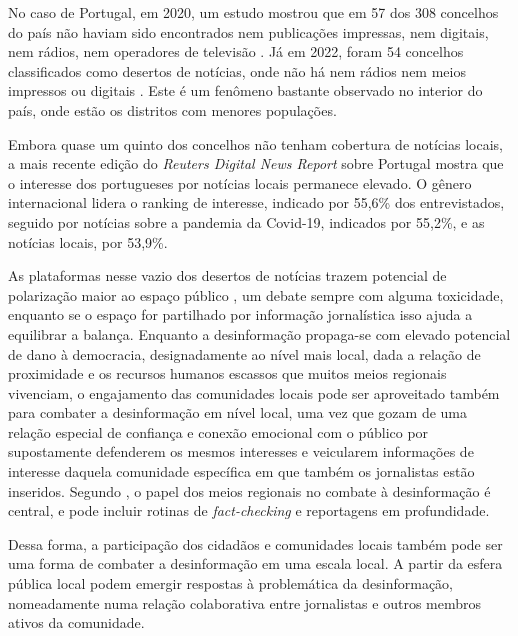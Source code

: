 \documentclass[portuguese]{textolivre}
\begin{document}
No caso de Portugal, em 2020, um estudo mostrou que em 57 dos 308 concelhos do país não haviam sido encontrados nem publicações impressas, nem digitais, nem rádios, nem operadores de televisão \cite{ramos2021deserto}. Já em 2022, foram 54 concelhos classificados como desertos de notícias, onde não há nem rádios nem meios impressos ou digitais \cite{jeronimo2022}. Este é um fenômeno bastante observado no interior do país, onde estão os distritos com menores populações.

Embora quase um quinto dos concelhos não tenham cobertura de notícias locais, a mais recente edição do \emph{Reuters Digital News Report} sobre Portugal \cite{cardoso__reuters_2022} mostra que o interesse dos portugueses por notícias locais permanece elevado. O gênero internacional lidera o ranking de interesse, indicado por 55,6\% dos entrevistados, seguido por notícias sobre a pandemia da Covid-19, indicados por 55,2\%, e as notícias locais, por 53,9\%.

As plataformas nesse vazio dos desertos de notícias trazem potencial de polarização maior ao espaço público \cite{abernathy2022}, um debate sempre com alguma toxicidade, enquanto se o espaço for partilhado por informação jornalística isso ajuda a equilibrar a balança. Enquanto a desinformação propaga-se com elevado potencial de dano à democracia, designadamente ao nível mais local, dada a relação de proximidade e os recursos humanos escassos que muitos meios regionais vivenciam, o engajamento das comunidades locais pode ser aproveitado também para combater a desinformação em nível local, uma vez que gozam de uma relação especial de confiança e conexão emocional com o público por supostamente defenderem os mesmos interesses e veicularem informações de interesse daquela comunidade específica em que também os jornalistas estão inseridos. Segundo \textcite{jeronimoespartaza022}, o papel dos meios regionais no combate à desinformação é central, e pode incluir rotinas de \emph{fact-checking} e reportagens em profundidade.

Dessa forma, a participação dos cidadãos e comunidades locais também pode ser uma forma de combater a desinformação em uma escala local. A partir da esfera pública local podem emergir respostas à problemática da desinformação, nomeadamente numa relação colaborativa entre jornalistas e outros membros ativos da comunidade.
\end{document}
